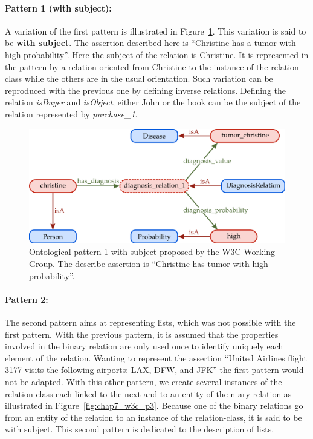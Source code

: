 \paragraph{Pattern 1 (with subject):} A variation of the first pattern is illustrated in Figure~\ref{fig:chap7_w3c_p1}. This variation is said to be \textbf{with subject}. The assertion described here is ``Christine has a tumor with high probability''. Here the subject of the relation is Christine. It is represented in the pattern by a relation oriented from Christine to the instance of the relation-class while the others are in the usual orientation. Such variation can be reproduced with the previous one by defining inverse relations. Defining the relation \textit{isBuyer} and \textit{isObject}, either John or the book can be the subject of the relation represented by \textit{purchase\_1}.

\begin{figure}[ht!]
\centering
\includegraphics[scale=0.4]{figures/chapter7/w3c_p1.png}
\caption{\label{fig:chap7_w3c_p1} Ontological pattern 1 with subject proposed by the W3C Working Group. The describe assertion is ``Christine has tumor with high probability''.}
\end{figure}

\paragraph{Pattern 2:} The second pattern aims at representing lists, which was not possible with the first pattern. With the previous pattern, it is assumed that the properties involved in the binary relation are only used once to identify uniquely each element of the relation. Wanting to represent the assertion ``United Airlines flight 3177 visits the following airports: LAX, DFW, and JFK'' the first pattern would not be adapted. With this other pattern, we create several instances of the relation-class each linked to the next and to an entity of the n-ary relation as illustrated in Figure~\ref{fig:chap7_w3c_p3}. Because one of the binary relations go from an entity of the relation to an instance of the relation-class, it is said to be with subject. This second pattern is dedicated to the description of lists.

